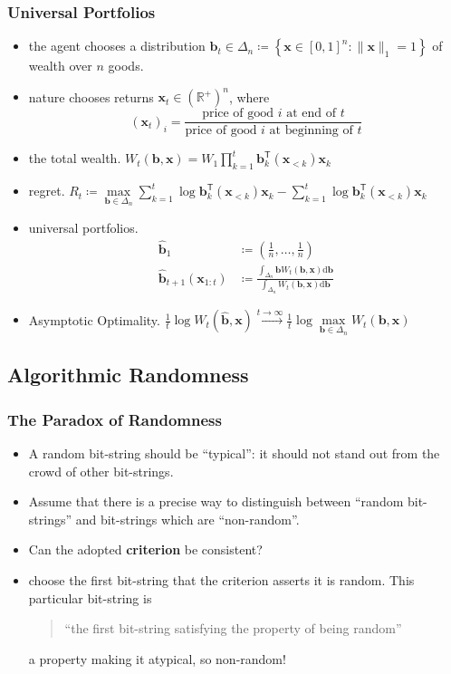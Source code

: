 \documentclass[UTF8,11pt,colorlinks,compress,openany]{beamer}%
\begin{document}
\begin{frame}\frametitle{Universal Portfolios}
	\begin{itemize}
		\item the agent chooses a distribution $\mathbf{b}_t\in\Delta_n\coloneqq \left\{\mathbf{x}\in[0,1]^n:\|\mathbf{x}\|_1=1\right\}$ of wealth over $n$ goods.
		\item nature chooses returns $\mathbf{x}_t\in(\mathbb{R}^+)^n$, where \[(\mathbf{x}_t)_i=\frac{\text{price of good $i$ at end of $t$}}{\text{price of good $i$ at beginning of $t$}}\]
		\item the total wealth.
		$W_t(\mathbf{b},\mathbf{x})=W_1\prod\limits_{k=1}^t\mathbf{b}_k^\mathsf{T}(\mathbf{x}_{<k})\mathbf{x}_k$
		\item regret.
		$R_t\coloneqq \max\limits_{\mathbf{b}\in\Delta_n}\sum\limits_{k=1}^t\log \mathbf{b}_k^\mathsf{T}(\mathbf{x}_{<k})\mathbf{x}_k-\sum\limits_{k=1}^t\log \mathbf{b}_k^\mathsf{T}(\mathbf{x}_{<k})\mathbf{x}_k$
		\item universal portfolios.
		\begin{align*}
		\hat{\mathbf{b}}_1&\coloneqq \left(\tfrac{1}{n},\dots,\tfrac{1}{n}\right)\\
		\hat{\mathbf{b}}_{t+1}(\mathbf{x}_{1:t})&\coloneqq \frac{\int_{\Delta_n}\!\!\mathbf{b} W_t(\mathbf{b},\mathbf{x})\mathrm{d}\mathbf{b}}{\int_{\Delta_n}\!\!W_t(\mathbf{b},\mathbf{x})\mathrm{d}\mathbf{b}}
		\end{align*}
		\item Asymptotic Optimality.
		$\frac{1}{t}\log W_t(\hat{\mathbf{b}},\mathbf{x})\xrightarrow{t\to\infty}\frac{1}{t}\log \max\limits_{\mathbf{b}\in\Delta_n}W_t(\mathbf{b},\mathbf{x})$
	\end{itemize}
\end{frame}

\subsection{Algorithmic Randomness}

\begin{frame}\frametitle{The Paradox of Randomness}
\begin{itemize}
	\item A random bit-string should be ``typical'': it should not stand out from the crowd of other bit-strings.
	\item Assume that there is a precise way to distinguish between ``random bit-strings'' and bit-strings which are ``non-random''.
	\item Can the adopted \textbf{criterion} be consistent?
	\item choose the first bit-string that the criterion asserts it is random. This particular bit-string is
	\begin{quote}
		\begin{center}
			``the first bit-string satisfying the property of being random''
		\end{center}
	\end{quote}
	a property making it atypical, so non-random!
\end{itemize}
\end{frame}
\end{document}
